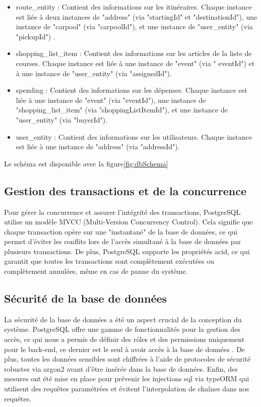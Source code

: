 \begin{itemize}
    \item route\_entity : Contient des informations sur les itinéraires.
    Chaque instance est liée à deux instances de "address" (via "startingId" et "destinationId"), une instance de "carpool" (via "carpoolId"), et une instance de "user\_entity" (via "pickupId") .\\
    \item shopping\_list\_item : Contient des informations sur les articles de la liste de courses.
    Chaque instance est liée à une instance de "event" (via " eventId") et à une instance de "user\_entity" (via "assignedId").\\
    \item spending : Contient des informations sur les dépenses.
    Chaque instance est liée à une instance de "event" (via "eventId"), une instance de "shopping\_list\_item" (via "shoppingListItemId"), et une instance de "user\_entity" (via "buyerId").\\
    \item user\_entity : Contient des informations sur les utilisateurs.
    Chaque instance est liée à une instance de "address" (via "addressId").\\
\end{itemize}

Le schéma est disponible avec la figure\ref{fig:dbSchema}%

\subsection{Gestion des transactions et de la concurrence}\label{subsec:transaction-concurrency}
Pour gérer la concurrence et assurer l'intégrité des transactions, PostgreSQL utilise un modèle MVCC (Multi-Version Concurrency Control).
Cela signifie que chaque transaction opère sur une "instantané" de la base de données, ce qui permet d'éviter les conflits lors de l'accès simultané à la base de données par plusieurs transactions.
De plus, PostgreSQL supporte les propriétés \Gls{acid}, ce qui garantit que toutes les transactions sont complètement exécutées ou complètement annulées, même en cas de panne du système.\\

\subsection{Sécurité de la base de données}\label{subsec:database-security}
La sécurité de la base de données a été un aspect crucial de la conception du système.
PostgreSQL offre une gamme de fonctionnalités pour la gestion des accès, ce qui nous a permis de définir des rôles et des permissions uniquement pour le back-end, ce dernier est le seul à avoir accès à la base de données .
De plus, toutes les données sensibles sont chiffrées à l'aide de protocoles de sécurité robustes via argon2 avant d'être insérée dans la base de données.
Enfin, des mesures ont été mise en place pour prévenir les injections \Gls{sql} via typeORM qui utilisent des requêtes paramétrées et évitent l'interpolation de chaînes dans nos requêtes.\\

